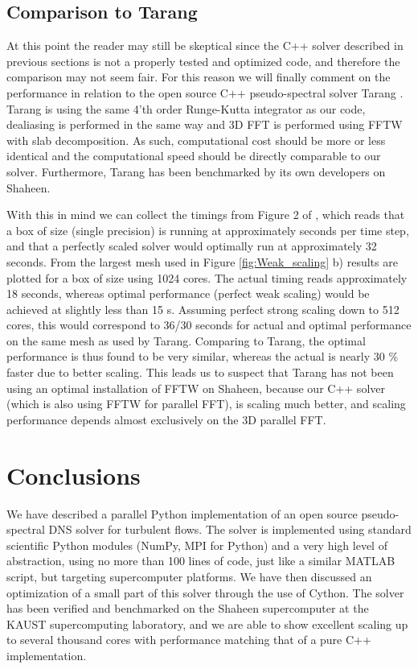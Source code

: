 \documentclass[final,3p,times,twocolumn]{elsarticle}
\begin{document}
\subsection{Comparison to Tarang}
At this point the reader may still be skeptical since the C++ solver described 
in previous sections  
is not a properly tested and optimized code, and therefore the comparison may  
not seem fair. For this reason we will finally comment on the performance in 
relation to 
the open source C++ pseudo-spectral solver Tarang \cite{tarang}. 
Tarang is 
using the same 4'th order Runge-Kutta integrator as our code, dealiasing is 
performed in the same way and 3D FFT is performed using FFTW with slab 
decomposition. As such, computational cost should be more or less identical and 
the computational speed should be directly comparable to our solver. 
Furthermore, Tarang  has been benchmarked by its own developers on Shaheen. 

With this 
in mind we can collect the timings from Figure 2 of \cite{tarang}, which reads 
that a box of size  (single precision) is running at approximately  
seconds per time step, and that a perfectly scaled solver would optimally run 
at approximately 32 seconds. From the 
largest mesh used in Figure \ref{fig:Weak_scaling} b) results are plotted for a 
box of size  using 1024 cores. The actual timing reads approximately 18 
seconds, whereas optimal performance 
(perfect weak scaling) would be achieved at slightly less than 15 s. Assuming 
perfect strong 
scaling down to 512 cores, this would correspond to 36/30 seconds for actual 
and optimal performance on the same mesh as used by Tarang. Comparing to 
Tarang, the optimal performance is thus found to be very similar, whereas
the actual is nearly 30 \% faster due to better scaling. This leads us to 
suspect that Tarang has not been using an optimal installation of FFTW on 
Shaheen, because our C++ solver (which is also using FFTW for parallel FFT), is 
scaling much better, and scaling performance depends almost exclusively on the 
3D parallel FFT.

\section{Conclusions}

We have described a parallel Python implementation of an open source 
pseudo-spectral DNS solver for turbulent flows. The solver is implemented using 
standard scientific Python modules (NumPy, MPI for Python) and a very high 
level of 
abstraction, using no more than 100 lines of code, just like a similar MATLAB 
script, but targeting supercomputer platforms. We have then discussed an 
optimization of a small part of this solver through the use of Cython. The 
solver has been verified and benchmarked on the Shaheen supercomputer at the 
KAUST supercomputing laboratory, and we are able to show excellent scaling up 
to several thousand cores with performance matching that of a pure C++ 
implementation.
\end{document}
